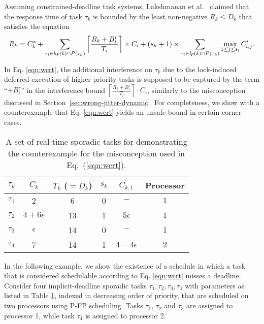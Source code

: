 Assuming constrained-deadline task systems, Lakshmanan et al.~\cite{lakshmanan-2009} claimed that the response time of task $\tau_k$ is bounded by the least non-negative $R_k \leq D_k$ that satisfies the equation
\begin{equation}
\label{eqn:wcrt}
R_k = C_k^{\ast} + \sum_{\tau_i \in \mathit{hp(k)} \cap P(\tau_k)} \left \lceil \frac{R_k + B_i^r}{T_i} \right \rceil \times C_i + (s_k+1) \times \sum_{\tau_l \in \mathit{lp(k)} \cap P(\tau_k)} \max_{1 \leq j \leq s_l} C_{l,j}^{\prime}.
\end{equation}



In Eq. \eqref{eqn:wcrt}, the additional interference on $\tau_k$ due to the lock-induced deferred execution of higher-priority tasks is supposed to be captured by the term ``$+ B^r_i$'' in the interference bound  $\left \lceil \frac{R_k + B_i^r}{T_i} \right \rceil \cdot C_i$,  similarly to the misconception discussed in Section~\ref{sec:wrong-jitter-dynamic}. For completeness, we show with a counterexample that Eq. \eqref{eqn:wcrt} yields an unsafe bound in certain corner cases.



%

\begin{table}[t]
\centering
    \begin{tabular}{|c|c|c|c|c|c|} 
 \hline
        $\tau_k$ & $C_k$ & $T_k$ ($= D_k$) & $s_k$ & $C_{k,1}^{\prime}$ & Processor\\
        \hline
        $\tau_1$ & 2             & 6  & 0 & $-$ & $1$\\ 
        $\tau_2$ & $4+6\epsilon$ & 13 & 1 & $5\epsilon$& $1$\\
        $\tau_3$ & $\epsilon$    & 14 & 0 & $-$ & $1$\\
        $\tau_4$ & 7             & 14 & 1 & $4-4\epsilon$ & $2$\\ 
        \hline
    \end{tabular}
    \caption{A set of real-time sporadic tasks for demonstrating the counterexample for the misconception used in Eq.~(\ref{eqn:wcrt}).}
    \label{table:parameters}
\end{table}

In the following example, 
we show the existence of a schedule in which a task that is considered schedulable according to Eq. \eqref{eqn:wcrt} misses a deadline.
 Consider four implicit-deadline sporadic tasks ${\tau_1, \tau_2, \tau_3, \tau_4}$ with parameters as listed in Table \ref{table:parameters}, indexed in decreasing order of priority, that are scheduled on two processors using P-FP scheduling. Tasks $\tau_1$, $\tau_2$ and $\tau_3$ are assigned to processor 1, while task $\tau_4$ is assigned to processor 2.

